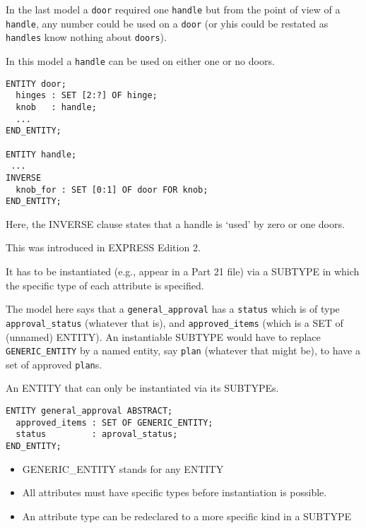 \begin{remarks}
\remintro


In the last model a \texttt{door} required one \texttt{handle} but from 
the point of view of a \texttt{handle}, any number could be used on
a \texttt{door} (or yhis could be restated as \texttt{handles} know
nothing about \texttt{doors}).

In this model a \texttt{handle} can be used on either one or no doors.

\remend
\end{remarks}


\begin{verbatim}
ENTITY door;
  hinges : SET [2:?] OF hinge;
  knob   : handle;
  ...
END_ENTITY;

ENTITY handle;
 ...
INVERSE
  knob_for : SET [0:1] OF door FOR knob;
END_ENTITY;
\end{verbatim}
Here, the INVERSE clause states that a handle is `used' by zero or one doors.

\begin{remarks}
\remintro


    This was introduced in EXPRESS Edition 2.

    It has to be instantiated (e.g., appear in a Part 21 file)
via a SUBTYPE in which the specific type of each attribute is specified.

    The model here says that a \texttt{general\_approval} has a \texttt{status}
which is of type \texttt{approval\_status} (whatever that is), and 
\texttt{approved\_items} (which is a SET of (unnamed) ENTITY). An instantiable
SUBTYPE would have to replace \texttt{GENERIC\_ENTITY} by a named entity,
say \texttt{plan} (whatever that might be), to have a set of 
approved \texttt{plan}s.
 

\remend
\end{remarks}


    An ENTITY that can only be instantiated via its SUBTYPEs.

\begin{verbatim}
ENTITY general_approval ABSTRACT;
  approved_items : SET OF GENERIC_ENTITY;
  status         : aproval_status;
END_ENTITY;
\end{verbatim}

\begin{itemize}
\item GENERIC\_ENTITY stands for any ENTITY
\item All attributes must have specific types before
      instantiation is possible.
\item An attribute type can be redeclared to a more
      specific kind in a SUBTYPE
\end{itemize}


